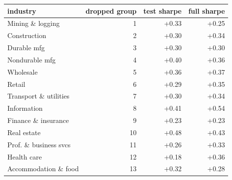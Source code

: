 \begin{tabular}{lrrr}
\toprule
industry & dropped group & test sharpe & full sharpe \\
\midrule
Mining \& logging & 1 & +0.33 & +0.25 \\
Construction & 2 & +0.30 & +0.34 \\
Durable mfg & 3 & +0.30 & +0.30 \\
Nondurable mfg & 4 & +0.40 & +0.36 \\
Wholesale & 5 & +0.36 & +0.37 \\
Retail & 6 & +0.29 & +0.35 \\
Transport \& utilities & 7 & +0.30 & +0.34 \\
Information & 8 & +0.41 & +0.54 \\
Finance \& insurance & 9 & +0.23 & +0.23 \\
Real estate & 10 & +0.48 & +0.43 \\
Prof. \& business svcs & 11 & +0.26 & +0.33 \\
Health care & 12 & +0.18 & +0.36 \\
Accommodation \& food & 13 & +0.32 & +0.28 \\
\bottomrule
\end{tabular}
